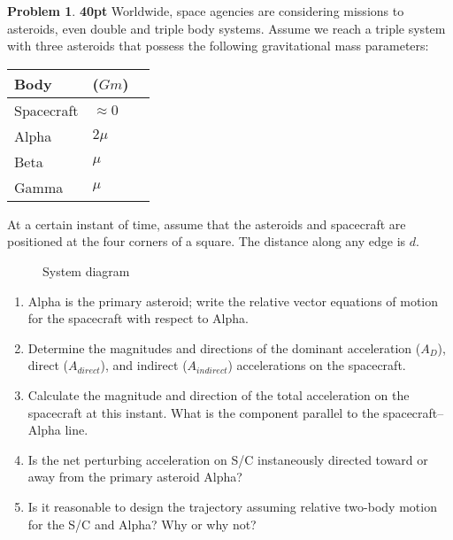 \documentclass[10pt]{article}
\theoremstyle{definition}
\newtheorem{prob}{Problem}[section]
\newenvironment{subprob}%
{\renewcommand{\theenumi}{\alph{enumi}}\renewcommand{\labelenumi}{(\theenumi)}\begin{enumerate}}%
{\end{enumerate}}%
\begin{document}
\clearpage\newpage
\begin{prob}
    \textbf{40pt} Worldwide, space agencies are considering missions to asteroids, even double and triple body systems. 
    Assume we reach a triple system with three asteroids that possess the following gravitational mass parameters:

    \begin{center}
        \begin{tabular}{llr}  
            \toprule
            Body & (\( Gm\)) \\
            \midrule
            Spacecraft & \( \approx 0 \) \\
            Alpha & \( 2 \mu \) \\
            Beta & \( \mu \) \\
            Gamma & \( \mu \) \\
            \bottomrule
        \end{tabular}
    \end{center}

At a certain instant of time, assume that the asteroids and spacecraft are positioned at the four corners of a square. 
The distance along any edge is \( d\).
\begin{figure}[htbp]
    \centering
{}
\caption{System diagram}
\end{figure}

\begin{subprob}
    \item Alpha is the primary asteroid; write the relative vector equations of motion for the spacecraft with respect to Alpha.
    \item Determine the magnitudes and directions of the dominant acceleration (\(A_D\)), direct (\(A_{direct}\)), and indirect (\(A_{indirect}\)) accelerations on the spacecraft.
    \item Calculate the magnitude and direction of the total acceleration on the spacecraft at this instant. 
        What is the component parallel to the spacecraft--Alpha line.
    \item Is the net perturbing acceleration on S/C instaneously directed toward or away from the primary asteroid Alpha?

    \item Is it reasonable to design the trajectory assuming relative two-body motion for the S/C and Alpha?
        Why or why not?
\end{subprob}
\end{prob}
\end{document}
